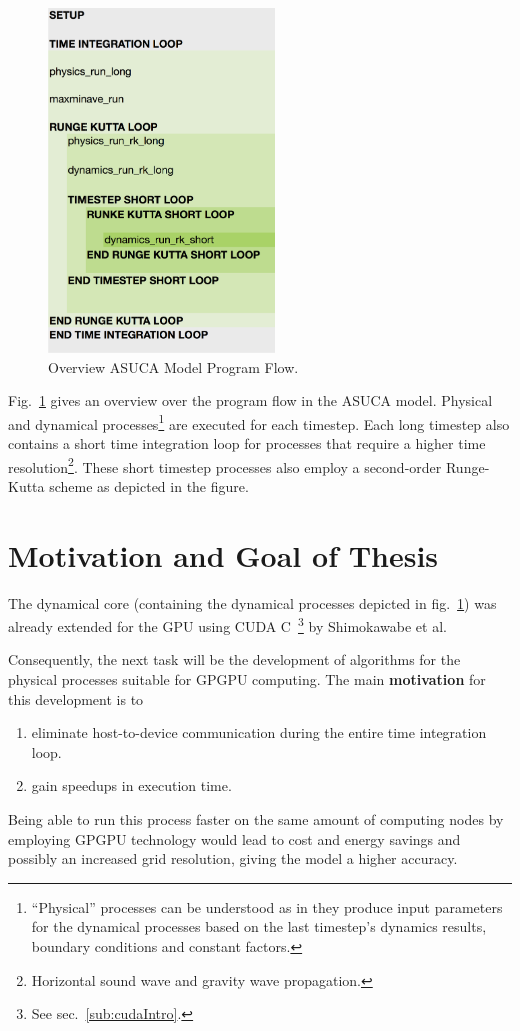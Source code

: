 \begin{figure}[htpb]
	\centering
	\includegraphics[width=6cm]{figures/arashiOverview}
	\caption[Overview ASUCA Model Program Flow]{Overview ASUCA Model Program Flow.}
	\label{figure:arashi}
\end{figure}

Fig.~\ref{figure:arashi} gives an overview over the program flow in the ASUCA model. Physical and dynamical processes\footnote{``Physical'' processes can be understood as in they produce input parameters for the dynamical processes based on the last timestep's dynamics results, boundary conditions and constant factors.} are executed for each timestep. Each long timestep also contains a short time integration loop for processes that require a higher time resolution\footnote{Horizontal sound wave and gravity wave propagation.}. These short timestep processes also employ a second-order Runge-Kutta scheme as depicted in the figure.~\cite[p. 2]{Shimokawabe2010}

\section{Motivation and Goal of Thesis} \label{sub:thesisMotivation}

The dynamical core (containing the dynamical processes depicted in fig.~\ref{figure:arashi}) was already extended for the GPU using CUDA C~\footnote{See sec.~\ref{sub:cudaIntro}.} by Shimokawabe et al.~\cite[p. 2]{Shimokawabe2011} 

Consequently, the next task will be the development of algorithms for the physical processes suitable for GPGPU computing. The main \textbf{motivation} for this development is to 
\begin{enumerate}
 \item eliminate host-to-device communication during the entire time integration loop.
 \item gain speedups in execution time. 
\end{enumerate}
Being able to run this process faster on the same amount of computing nodes by employing GPGPU technology would lead to cost and energy savings and possibly an increased grid resolution, giving the model a higher accuracy.

